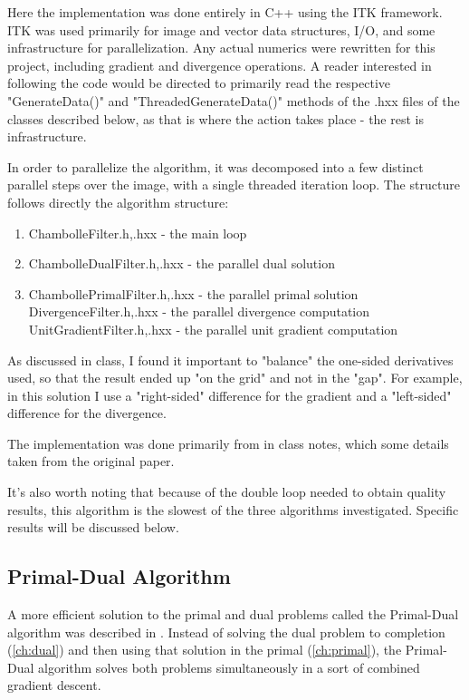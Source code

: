 \documentclass[11pt]{article}
\begin{document}
Here the implementation was done entirely in C++ using the ITK framework.
ITK was used primarily for image and vector data structures, I/O, and some infrastructure for parallelization.
Any actual numerics were rewritten for this project, including gradient and divergence operations.
A reader interested in following the code would be directed to primarily read the respective "GenerateData()" and "ThreadedGenerateData()" methods of the .hxx files of the classes described below, as that is where the action takes place - the rest is infrastructure.

In order to parallelize the algorithm, it was decomposed into a few distinct parallel steps over the image, with a single threaded iteration loop.  
The structure follows directly the algorithm structure:
\begin{enumerate}
\item
ChambolleFilter.h,.hxx - the main loop
\item
ChambolleDualFilter.h,.hxx - the parallel dual solution
\item
ChambollePrimalFilter.h,.hxx - the parallel primal solution \\
DivergenceFilter.h,.hxx - the parallel divergence computation \\
UnitGradientFilter.h,.hxx - the parallel unit gradient computation
\end{enumerate}

As discussed in class, I found it important to "balance" the one-sided derivatives used, so that the result ended up "on the grid" and not in the "gap".
For example, in this solution I use a "right-sided" difference for the gradient and a "left-sided" difference for the divergence.

The implementation was done primarily from in class notes, which some details taken from the original paper.

It's also worth noting that because of the double loop needed to obtain quality results, this algorithm is the slowest of the three algorithms investigated.
Specific results will be discussed below.

\subsection{Primal-Dual Algorithm}
A more efficient solution to the primal and dual problems called the Primal-Dual algorithm was described in \cite{zhu2008efficient}.
Instead of solving the dual problem to completion (\ref{ch:dual}) and then using that solution in the primal (\ref{ch:primal}), the Primal-Dual algorithm solves both problems simultaneously in a sort of combined gradient descent.
\end{document}
